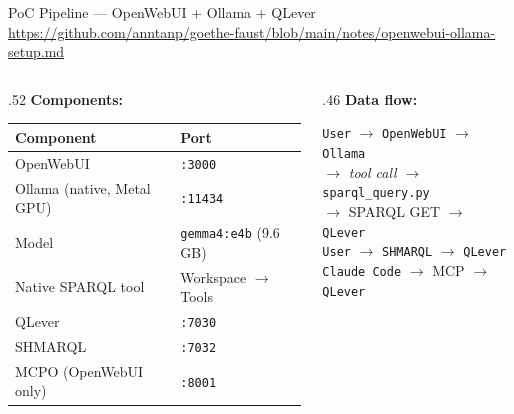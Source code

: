 \documentclass[xcolor,aspectratio=169,compress]{beamer}
\begin{document}
\begin{frame}{PoC Pipeline --- OpenWebUI + Ollama + QLever}
  \small
  {\tiny\url{https://github.com/anntanp/goethe-faust/blob/main/notes/openwebui-ollama-setup.md}}
  \smallskip

  \small
  \begin{columns}[t]
    \begin{column}{.52\textwidth}
      \textbf{Components:}
      \begin{tabular}{ll}
        \toprule
        Component & Port \\
        \midrule
        OpenWebUI & \texttt{:3000} \\
        Ollama (native, Metal GPU) & \texttt{:11434} \\
        Model & \texttt{gemma4:e4b} (9.6\,GB) \\
        Native SPARQL tool & Workspace $\to$ Tools \\
        QLever & \texttt{:7030} \\
        SHMARQL & \texttt{:7032} \\
        MCPO (OpenWebUI only) & \texttt{:8001} \\
        \bottomrule
      \end{tabular}
    \end{column}
    \begin{column}{.46\textwidth}
      \textbf{Data flow:}
      \medskip

      \scriptsize
      \texttt{User} $\to$ \texttt{OpenWebUI} $\to$ \texttt{Ollama} \\
      \hspace{1em}$\to$ \textit{tool call} $\to$ \texttt{sparql\_query.py} \\
      \hspace{1em}$\to$ SPARQL GET $\to$ \texttt{QLever} \\[4pt]
      \texttt{User} $\to$ \texttt{SHMARQL} $\to$ \texttt{QLever} \\[4pt]
      \texttt{Claude Code} $\to$ MCP $\to$ \texttt{QLever}

    \end{column}
  \end{columns}
\end{frame}
\end{document}
